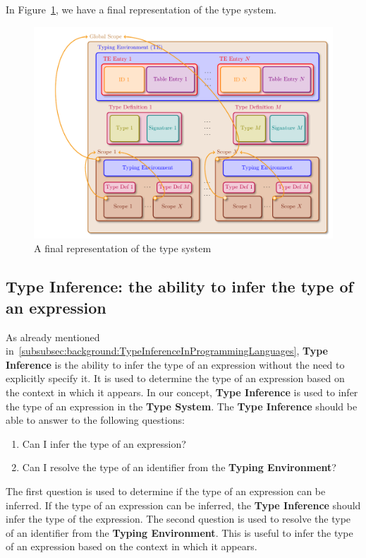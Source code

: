 In Figure~\ref{lst:concept:type_system}, we have a final representation of the type system.

\begin{figure}[tbh]
    \centering
    \includegraphics[width=0.9\linewidth]{figs/concept/type_system.pdf}
    \caption{A final representation of the type system}
    \label{lst:concept:type_system}
\end{figure}

\subsection{Type Inference: the ability to infer the type of an expression}\label{subsec:concept:TypeInferenceTheAbilityToInferTheTypeOfAnExpression}

As already mentioned in~\ref{subsubsec:background:TypeInferenceInProgrammingLanguages}, \textbf{Type Inference} is the ability to infer the type of an expression without the need to explicitly specify it. It is used to determine the type of an expression based on the context in which it appears.
In our concept, \textbf{Type Inference} is used to infer the type of an expression in the \textbf{Type System}.
The \textbf{Type Inference} should be able to answer to the following questions:
\begin{enumerate}
    \item Can I infer the type of an expression?
    \item Can I resolve the type of an identifier from the \textbf{Typing Environment}?
\end{enumerate}

The first question is used to determine if the type of an expression can be inferred. If the type of an expression can be inferred, the \textbf{Type Inference} should infer the type of the expression. The second question is used to resolve the type of an identifier from the \textbf{Typing Environment}. This is useful to infer the type of an expression based on the context in which it appears.

